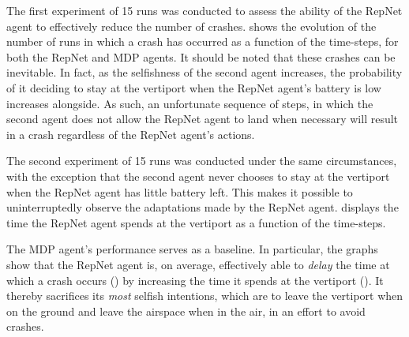 The first experiment of 15 runs was conducted to assess the ability of the RepNet agent to effectively reduce the number of crashes.  shows the evolution of the number of runs in which a crash has occurred as a function of the time-steps, for both the RepNet and MDP agents. It should be noted that these crashes can be inevitable. In fact, as the selfishness of the second agent increases, the probability of it deciding to stay at the vertiport when the RepNet agent's battery is low increases alongside. As such, an unfortunate sequence of steps, in which the second agent does not allow the RepNet agent to land when necessary will result in a crash regardless of the RepNet agent's actions.

The second experiment of 15 runs was conducted under the same circumstances, with the exception that the second agent never chooses to stay at the vertiport when the RepNet agent has little battery left. This makes it possible to uninterruptedly observe the adaptations made by the RepNet agent.  displays the time the RepNet agent spends at the vertiport as a function of the time-steps.

The MDP agent's performance serves as a baseline. In particular, the graphs show that the RepNet agent is, on average, effectively able to \textit{delay} the time at which a crash occurs () by increasing the time it spends at the vertiport (). It thereby sacrifices its \textit{most} selfish intentions, which are to leave the vertiport when on the ground and leave the airspace when in the air, in an effort to avoid crashes.

